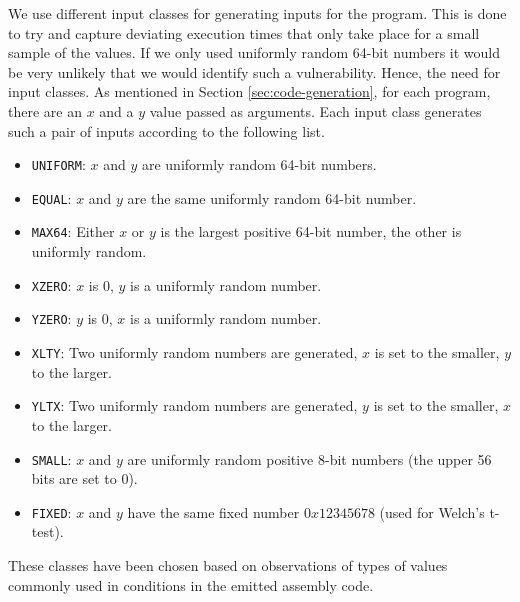 We use different input classes for generating inputs for the program. 
This is done to try and capture deviating execution times that only take place for a small sample of the values.
If we only used uniformly random 64-bit numbers it would be very unlikely that we would identify such a vulnerability.
Hence, the need for input classes.
As mentioned in Section \ref{sec:code-generation}, for each program, there are an $x$ and a $y$ value passed as arguments. 
Each input class generates such a pair of inputs according to the following list.
\begin{itemize}
    \setlength\itemsep{-0.6em}
    \item \texttt{UNIFORM}: $x$ and $y$ are uniformly random 64-bit numbers.
    \item \texttt{EQUAL}:  $x$ and $y$ are the same uniformly random 64-bit number.
    \item \texttt{MAX64}: Either $x$ or $y$ is the largest positive 64-bit number, the other is uniformly random.
    \item \texttt{XZERO}: $x$ is 0, $y$ is a uniformly random number.
    \item \texttt{YZERO}: $y$ is 0, $x$ is a uniformly random number.
    \item \texttt{XLTY}: Two uniformly random numbers are generated, $x$ is set to the smaller, $y$ to the larger.
    \item \texttt{YLTX}: Two uniformly random numbers are generated, $y$ is set to the smaller, $x$ to the larger.
    \item \texttt{SMALL}: $x$ and $y$ are uniformly random positive 8-bit numbers (the upper 56 bits are set to 0).
    \item \texttt{FIXED}: $x$ and $y$ have the same fixed number $0x12345678$ (used for Welch's t-test).
\end{itemize}
These classes have been chosen based on observations of types of values commonly used in conditions in the emitted assembly code.

